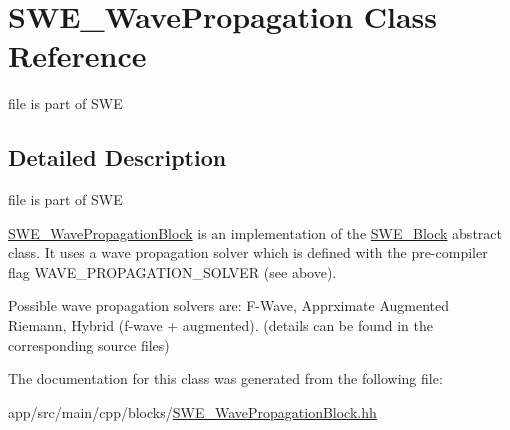 \hypertarget{classSWE__WavePropagation}{}\section{S\+W\+E\+\_\+\+Wave\+Propagation Class Reference}
\label{classSWE__WavePropagation}


file is part of S\+WE  




\subsection{Detailed Description}
file is part of S\+WE 

\hyperlink{classSWE__WavePropagationBlock}{S\+W\+E\+\_\+\+Wave\+Propagation\+Block} is an implementation of the \hyperlink{classSWE__Block}{S\+W\+E\+\_\+\+Block} abstract class. It uses a wave propagation solver which is defined with the pre-\/compiler flag W\+A\+V\+E\+\_\+\+P\+R\+O\+P\+A\+G\+A\+T\+I\+O\+N\+\_\+\+S\+O\+L\+V\+ER (see above).

Possible wave propagation solvers are\+: F-\/\+Wave, Apprximate Augmented Riemann, Hybrid (f-\/wave + augmented). (details can be found in the corresponding source files) 

The documentation for this class was generated from the following file\+:\begin{DoxyCompactItemize}
\item 
app/src/main/cpp/blocks/\hyperlink{SWE__WavePropagationBlock_8hh}{S\+W\+E\+\_\+\+Wave\+Propagation\+Block.\+hh}\end{DoxyCompactItemize}
